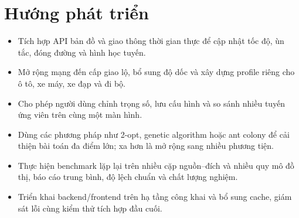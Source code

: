 \section{Hướng phát triển}

\begin{itemize}[itemsep=2pt]
  \item Tích hợp API bản đồ và giao thông thời gian thực để cập nhật tốc độ,
  ùn tắc, đóng đường và hình học tuyến.
  \item Mở rộng mạng đến cấp giao lộ, bổ sung độ dốc và xây dựng profile riêng
  cho ô tô, xe máy, xe đạp và đi bộ.
  \item Cho phép người dùng chỉnh trọng số, lưu cấu hình và so sánh nhiều tuyến
  ứng viên trên cùng một màn hình.
  \item Dùng các phương pháp như 2-opt, genetic algorithm hoặc ant colony để
  cải thiện bài toán đa điểm lớn; xa hơn là mở rộng sang nhiều phương tiện.
  \item Thực hiện benchmark lặp lại trên nhiều cặp nguồn--đích và nhiều quy mô
  đồ thị, báo cáo trung bình, độ lệch chuẩn và chất lượng nghiệm.
  \item Triển khai backend/frontend trên hạ tầng công khai và bổ sung cache,
  giám sát lỗi cùng kiểm thử tích hợp đầu cuối.
\end{itemize}
